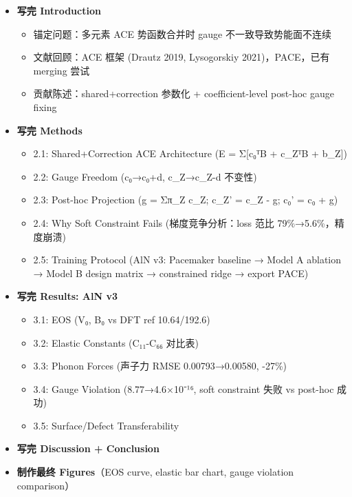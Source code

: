 \documentclass[
  12pt,
]{ctexart}
\providecommand{\tightlist}{%
  \setlength{\itemsep}{0pt}\setlength{\parskip}{0pt}}
\begin{document}
\begin{itemize}
\tightlist
\item[$\square$]
  \textbf{写完 Introduction}

  \begin{itemize}
  \tightlist
  \item
    锚定问题：多元素 ACE 势函数合并时 gauge 不一致导致势能面不连续
  \item
    文献回顾：ACE 框架 (Drautz 2019, Lysogorskiy 2021)，PACE，已有
    merging 尝试
  \item
    贡献陈述：shared+correction 参数化 + coefficient-level post-hoc
    gauge fixing
  \end{itemize}
\item[$\square$]
  \textbf{写完 Methods}

  \begin{itemize}
  \tightlist
  \item
    2.1: Shared+Correction ACE Architecture (E = Σ{[}c₀ᵀB + c\_ZᵀB +
    b\_Z{]})
  \item
    2.2: Gauge Freedom (c₀→c₀+d, c\_Z→c\_Z-d 不变性)
  \item
    2.3: Post-hoc Projection (g = Σπ\_Z c\_Z; c\_Z' = c\_Z - g; c₀' = c₀
    + g)
  \item
    2.4: Why Soft Constraint Fails (梯度竞争分析：loss 范比
    79\%→5.6\%，精度崩溃)
  \item
    2.5: Training Protocol (AlN v3: Pacemaker baseline → Model A
    ablation → Model B design matrix → constrained ridge → export PACE)
  \end{itemize}
\item[$\square$]
  \textbf{写完 Results: AlN v3}

  \begin{itemize}
  \tightlist
  \item
    3.1: EOS (V₀, B₀ vs DFT ref 10.64/192.6)
  \item
    3.2: Elastic Constants (C₁₁-C₆₆ 对比表)
  \item
    3.3: Phonon Forces (声子力 RMSE 0.00793→0.00580, -27\%)
  \item
    3.4: Gauge Violation (8.77→4.6×10⁻¹⁶, soft constraint 失败 vs
    post-hoc 成功)
  \item
    3.5: Surface/Defect Transferability
  \end{itemize}
\item[$\square$]
  \textbf{写完 Discussion + Conclusion}
\item[$\square$]
  \textbf{制作最终 Figures}（EOS curve, elastic bar chart, gauge
  violation comparison）
\end{itemize}
\end{document}
